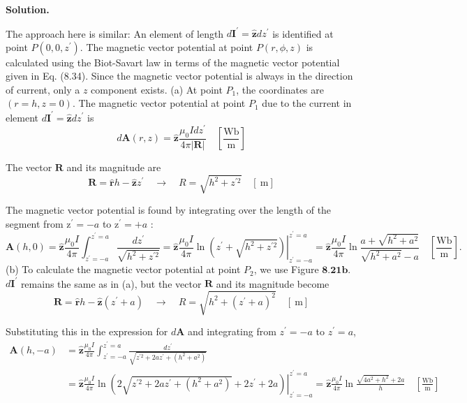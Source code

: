 \documentclass[12pt, a4paper, oneside]{report}
\newenvironment{solution}{
  \par\medskip\noindent
  \textbf{Solution.}\quad\itshape
  \par\noindent\makebox[\linewidth]{\rule{\textwidth}{0.4pt}}
}{
  \par\noindent\makebox[\linewidth]{\rule{\textwidth}{0.4pt}}
  \par\medskip
}
\begin{document}
\begin{solution}
The approach here is similar: An element of length $d \mathbf{I}^{\prime}=\hat{\mathbf{z}} d z^{\prime}$ is identified at point $P\left(0,0, z^{\prime}\right)$. The magnetic vector potential at point $P(r, \phi, z)$ is calculated using the Biot-Savart law in terms of the magnetic vector potential given in Eq. (8.34). Since the magnetic vector potential is always in the direction of current, only a $z$ component exists.
(a) At point $P_1$, the coordinates are $(r=h, z=0)$. The magnetic vector potential at point $P_1$ due to the current in element $d \mathbf{I}^{\prime}=\hat{\mathbf{z}} d z^{\prime}$ is
$$
d \mathbf{A}(r, z)=\hat{\mathbf{z}} \frac{\mu_0 I d z^{\prime}}{4 \pi|\mathbf{R}|} \quad\left[\frac{\mathrm{Wb}}{\mathrm{m}}\right]
$$

The vector $\mathbf{R}$ and its magnitude are
$$
\mathbf{R}=\hat{\mathbf{r}} h-\hat{\mathbf{z}} z^{\prime} \quad \rightarrow \quad R=\sqrt{h^2+z^{\prime 2}} \quad[\mathrm{~m}]
$$

The magnetic vector potential is found by integrating over the length of the segment from $\mathrm{z}^{\prime}=-a$ to $\mathrm{z}^{\prime}=+a$ :
$$
\mathbf{A}(h, 0)=\hat{\mathbf{z}} \frac{\mu_0 I}{4 \pi} \int_{z^{\prime}=-a}^{z^{\prime}=a} \frac{d z^{\prime}}{\sqrt{h^2+z^{\prime 2}}}=\left.\hat{\mathbf{z}} \frac{\mu_0 I}{4 \pi} \ln \left(z^{\prime}+\sqrt{h^2+z^{\prime 2}}\right)\right|_{z^{\prime}=-a} ^{z^{\prime}=a}=\hat{\mathbf{z}} \frac{\mu_0 I}{4 \pi} \ln \frac{a+\sqrt{h^2+a^2}}{\sqrt{h^2+a^2}-a} \quad\left[\frac{\mathrm{Wb}}{\mathrm{m}}\right] .
$$
(b) To calculate the magnetic vector potential at point $P_2$, we use Figure $\mathbf{8 . 2 1 b}$. $d \mathbf{I}^{\prime}$ remains the same as in (a), but the vector $\mathbf{R}$ and its magnitude become
$$
\mathbf{R}=\hat{\mathbf{r}} h-\hat{\mathbf{z}}\left(z^{\prime}+a\right) \quad \rightarrow \quad R=\sqrt{h^2+\left(z^{\prime}+a\right)^2} \quad[\mathrm{~m}]
$$

Substituting this in the expression for $d \mathbf{A}$ and integrating from $z^{\prime}=-a$ to $z^{\prime}=a$,
$$
\begin{aligned}
\mathbf{A}(h,-a) & =\hat{\mathbf{z}} \frac{\mu_0 I}{4 \pi} \int_{z^{\prime}=-a}^{z^{\prime}=a} \frac{d z^{\prime}}{\sqrt{z^{\prime 2}+2 a z^{\prime}+\left(h^2+a^2\right)}} \\
& =\left.\hat{\mathbf{z}} \frac{\mu_0 I}{4 \pi} \ln \left(2 \sqrt{z^{\prime 2}+2 a z^{\prime}+\left(h^2+a^2\right)}+2 z^{\prime}+2 a\right)\right|_{z^{\prime}=-a} ^{z^{\prime}=a}=\hat{\mathbf{z}} \frac{\mu_0 I}{4 \pi} \ln \frac{\sqrt{4 a^2+h^2}+2 a}{h} \quad\left[\frac{\mathrm{Wb}}{\mathrm{m}}\right]
\end{aligned}
$$



\end{solution}
\end{document}
